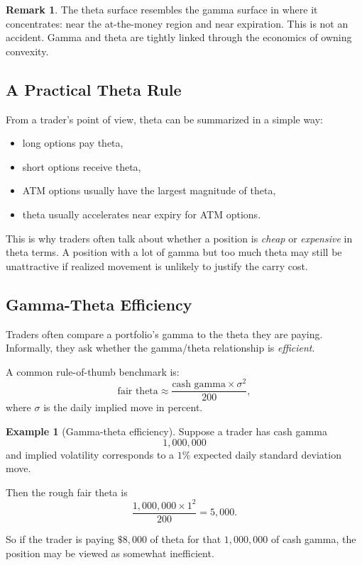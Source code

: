 \documentclass[11pt]{article}
\theoremstyle{definition}
\newtheorem{example}{Example}[section]
\newtheorem{remark}{Remark}[section]
\begin{document}
\begin{remark}
The theta surface resembles the gamma surface in where it concentrates: near the at-the-money region and near expiration. This is not an accident. Gamma and theta are tightly linked through the economics of owning convexity.
\end{remark}

\subsection{A Practical Theta Rule}

From a trader's point of view, theta can be summarized in a simple way:

\begin{itemize}[leftmargin=2em]
    \item long options pay theta,
    \item short options receive theta,
    \item ATM options usually have the largest magnitude of theta,
    \item theta usually accelerates near expiry for ATM options.
\end{itemize}

This is why traders often talk about whether a position is \emph{cheap} or \emph{expensive} in theta terms. A position with a lot of gamma but too much theta may still be unattractive if realized movement is unlikely to justify the carry cost.

\subsection{Gamma-Theta Efficiency}

Traders often compare a portfolio's gamma to the theta they are paying. Informally, they ask whether the gamma/theta relationship is \emph{efficient}.

A common rule-of-thumb benchmark is:
\[
\text{fair theta} \approx \frac{\text{cash gamma} \times \sigma^2}{200},
\]
where \(\sigma\) is the daily implied move in percent.

\begin{example}[Gamma-theta efficiency]
Suppose a trader has cash gamma
\[
1{,}000{,}000
\]
and implied volatility corresponds to a \(1\%\) expected daily standard deviation move.

Then the rough fair theta is
\[
\frac{1{,}000{,}000 \times 1^2}{200} = 5{,}000.
\]

So if the trader is paying \(\$8{,}000\) of theta for that \(1{,}000{,}000\) of cash gamma, the position may be viewed as somewhat inefficient.
\end{example}
\end{document}
